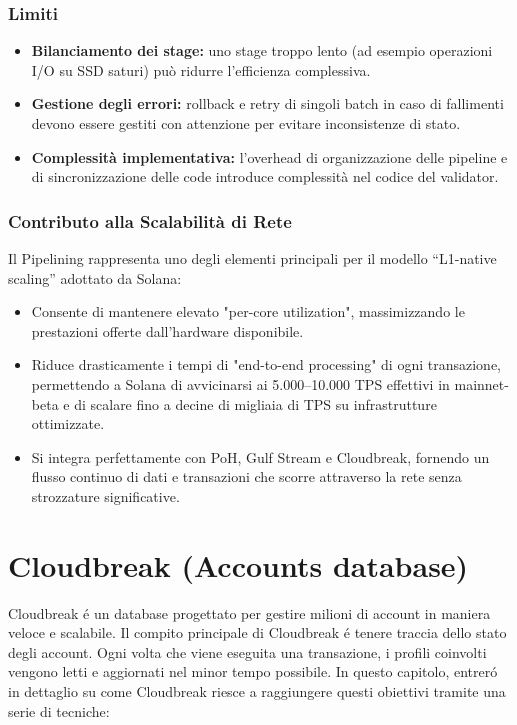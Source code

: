 \documentclass[a4paper,12pt]{report}
\begin{document}
	\subsection{Limiti}
	\begin{itemize}
		\item \textbf{Bilanciamento dei stage:} uno stage troppo lento (ad esempio operazioni I/O su SSD saturi) può ridurre l’efficienza complessiva.
		\item \textbf{Gestione degli errori:} rollback e retry di singoli batch in caso di fallimenti devono essere gestiti con attenzione per evitare inconsistenze di stato.
		\item \textbf{Complessità implementativa:} l’overhead di organizzazione delle pipeline e di sincronizzazione delle code introduce complessità nel codice del validator.
	\end{itemize}
	
	\subsection{Contributo alla Scalabilità di Rete}
	Il Pipelining rappresenta uno degli elementi principali per il modello “L1-native scaling” adottato da Solana:  
	\begin{itemize}
		\item Consente di mantenere elevato "per-core utilization", massimizzando le prestazioni offerte dall’hardware disponibile.  
		\item Riduce drasticamente i tempi di "end-to-end processing" di ogni transazione, permettendo a Solana di avvicinarsi ai 5.000–10.000 TPS effettivi in mainnet-beta e di scalare fino a decine di migliaia di TPS su infrastrutture ottimizzate.  
		\item Si integra perfettamente con PoH, Gulf Stream e Cloudbreak, fornendo un flusso continuo di dati e transazioni che scorre attraverso la rete senza strozzature significative.  
	\end{itemize}
	
	\chapter{Cloudbreak (Accounts database)}
	Cloudbreak é un database progettato per gestire milioni di account in maniera veloce e scalabile. Il compito principale di Cloudbreak é tenere traccia dello stato degli account. Ogni volta che viene eseguita una transazione, i profili coinvolti vengono letti e aggiornati nel minor tempo possibile. In questo capitolo, entreró in dettaglio su come Cloudbreak riesce a raggiungere questi obiettivi tramite una serie di tecniche:
	
\end{document}
